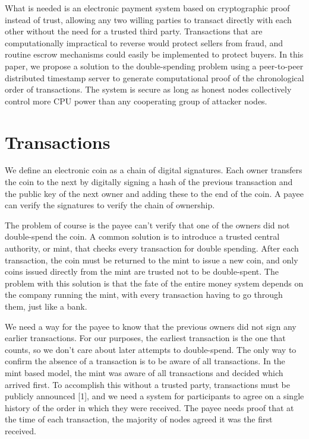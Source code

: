 \documentclass{article}
\begin{document}
What is needed is an electronic payment system based on cryptographic proof instead of trust,
allowing any two willing parties to transact directly with each other without the need for a trusted
third party.
Transactions that are computationally impractical to reverse would protect sellers
from fraud, and routine escrow mechanisms could easily be implemented to protect buyers.
In this paper, we propose a solution to the double-spending problem using a peer-to-peer distributed
timestamp server to generate computational proof of the chronological order of transactions.
The system is secure as long as honest nodes collectively control more CPU power than any
cooperating group of attacker nodes.

\section{Transactions}\label{sec:transactions}
We define an electronic coin as a chain of digital signatures.
Each owner transfers the coin to the next by digitally signing a hash of the previous transaction and the public key of the next owner
and adding these to the end of the coin.
A payee can verify the signatures to verify the chain of ownership.



The problem of course is the payee can't verify that one of the owners did not double-spend the coin.
A common solution is to introduce a trusted central authority, or mint, that checks every
transaction for double spending.
After each transaction, the coin must be returned to the mint to
issue a new coin, and only coins issued directly from the mint are trusted not to be double-spent.
The problem with this solution is that the fate of the entire money system depends on the
company running the mint, with every transaction having to go through them, just like a bank.

We need a way for the payee to know that the previous owners did not sign any earlier transactions.
For our purposes, the earliest transaction is the one that counts, so we don't care
about later attempts to double-spend.
The only way to confirm the absence of a transaction is to be aware of all transactions.
In the mint based model, the mint was aware of all transactions and
decided which arrived first.
To accomplish this without a trusted party, transactions must be
publicly announced [1], and we need a system for participants to agree on a single history of the
order in which they were received.
The payee needs proof that at the time of each transaction, the
majority of nodes agreed it was the first received.
\end{document}
